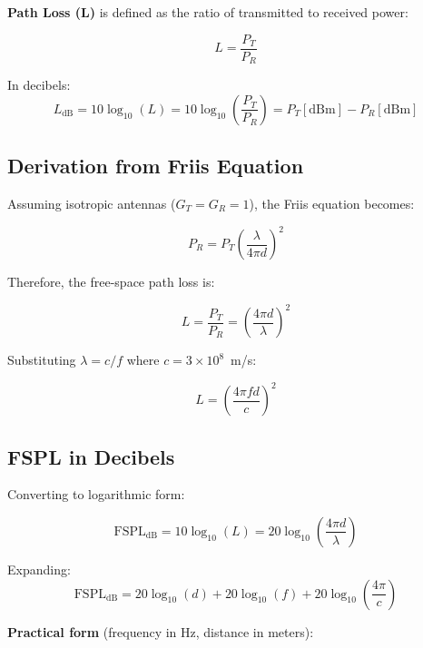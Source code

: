 \textbf{Path Loss (L)} is defined as the ratio of transmitted to received power:

\begin{equation}
L = \frac{P_T}{P_R}
\end{equation}

In decibels:
\begin{equation}
L_{\text{dB}} = 10\log_{10}(L) = 10\log_{10}\left(\frac{P_T}{P_R}\right) = P_T[\text{dBm}] - P_R[\text{dBm}]
\end{equation}

\subsection{Derivation from Friis Equation}

Assuming isotropic antennas ($G_T = G_R = 1$), the Friis equation becomes:

\begin{equation}
P_R = P_T \left(\frac{\lambda}{4\pi d}\right)^2
\end{equation}

Therefore, the free-space path loss is:

\begin{equation}
L = \frac{P_T}{P_R} = \left(\frac{4\pi d}{\lambda}\right)^2
\end{equation}

Substituting $\lambda = c/f$ where $c = 3 \times 10^8$~m/s:

\begin{equation}
L = \left(\frac{4\pi f d}{c}\right)^2
\end{equation}

\subsection{FSPL in Decibels}

Converting to logarithmic form:

\begin{equation}
\text{FSPL}_{\text{dB}} = 10\log_{10}(L) = 20\log_{10}\left(\frac{4\pi d}{\lambda}\right)
\end{equation}

Expanding:
\begin{equation}
\text{FSPL}_{\text{dB}} = 20\log_{10}(d) + 20\log_{10}(f) + 20\log_{10}\left(\frac{4\pi}{c}\right)
\end{equation}

\textbf{Practical form} (frequency in Hz, distance in meters):

